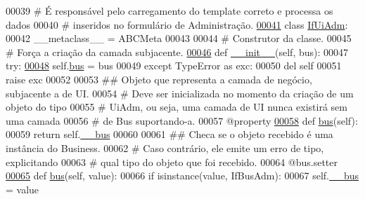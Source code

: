 \begin{DoxyCode}
00039 \textcolor{comment}{#   É responsável pelo carregamento do template correto e processa os dados}
00040 \textcolor{comment}{#   inseridos no formulário de Administração.}
\hypertarget{AdmUnit_8py_source_l00041}{}\hyperlink{classAdm_1_1AdmUnit_1_1IfUiAdm}{00041} \textcolor{keyword}{class }\hyperlink{classAdm_1_1AdmUnit_1_1IfUiAdm}{IfUiAdm}:
00042     \_\_metaclass\_\_ = ABCMeta
00043     
00044     \textcolor{comment}{# Construtor da classe.}
00045     \textcolor{comment}{#   Força a criação da camada subjacente.}
\hypertarget{AdmUnit_8py_source_l00046}{}\hyperlink{classAdm_1_1AdmUnit_1_1IfUiAdm_a971d8248262cb673fcbb104fa416f5ba}{00046}     \textcolor{keyword}{def }\hyperlink{classAdm_1_1AdmUnit_1_1IfUiAdm_a971d8248262cb673fcbb104fa416f5ba}{\_\_init\_\_}(self, bus):
00047         \textcolor{keywordflow}{try}:
\hypertarget{AdmUnit_8py_source_l00048}{}\hyperlink{classAdm_1_1AdmUnit_1_1IfUiAdm_a604bb1c41014e85eee44db64a79a7fcc}{00048}             self.\hyperlink{classAdm_1_1AdmUnit_1_1IfUiAdm_a604bb1c41014e85eee44db64a79a7fcc}{bus} = bus
00049         \textcolor{keywordflow}{except} TypeError \textcolor{keyword}{as} exc:
00050             del self
00051             \textcolor{keywordflow}{raise} exc
00052 
00053     \textcolor{comment}{## Objeto que representa a camada de negócio, subjacente a de UI.}
00054     \textcolor{comment}{#   Deve ser inicializada no momento da criação de um objeto do tipo}
00055     \textcolor{comment}{#   UiAdm, ou seja, uma camada de UI nunca existirá sem uma camada}
00056     \textcolor{comment}{#   de Bus suportando-a.}
00057     @property
\hypertarget{AdmUnit_8py_source_l00058}{}\hyperlink{classAdm_1_1AdmUnit_1_1IfUiAdm_a6846282d9a13a62cfe54639b6ee121f8}{00058}     \textcolor{keyword}{def }\hyperlink{classAdm_1_1AdmUnit_1_1IfUiAdm_a604bb1c41014e85eee44db64a79a7fcc}{bus}(self):
00059         \textcolor{keywordflow}{return} self.\hyperlink{classAdm_1_1AdmUnit_1_1IfUiAdm_adf49041050fd2ce5fef85b0698f331e5}{\_\_bus}
00060 
00061     \textcolor{comment}{## Checa se o objeto recebido é uma instância do Business.}
00062     \textcolor{comment}{#   Caso contrário, ele emite um erro de tipo, explicitando}
00063     \textcolor{comment}{#   qual tipo do objeto que foi recebido.}
00064     @bus.setter
\hypertarget{AdmUnit_8py_source_l00065}{}\hyperlink{classAdm_1_1AdmUnit_1_1IfUiAdm_a7fd2fe0a69d29fe49668381ae5cb4e08}{00065}     \textcolor{keyword}{def }\hyperlink{classAdm_1_1AdmUnit_1_1IfUiAdm_a604bb1c41014e85eee44db64a79a7fcc}{bus}(self, value):
00066         \textcolor{keywordflow}{if} isinstance(value, IfBusAdm):
00067             self.\hyperlink{classAdm_1_1AdmUnit_1_1IfUiAdm_adf49041050fd2ce5fef85b0698f331e5}{\_\_bus} = value

\end{DoxyCode}

